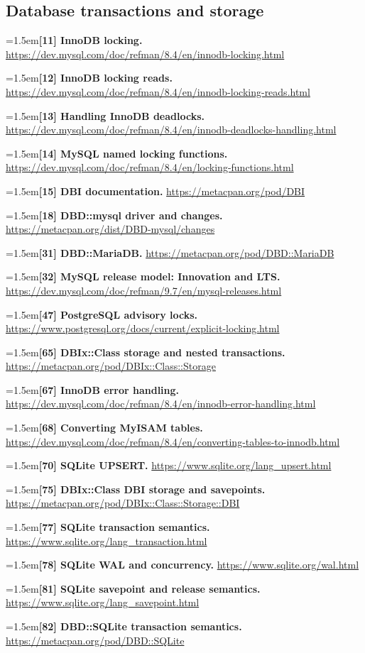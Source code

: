 \documentclass[11pt,openany]{book}
\newcommand{\refdoc}[2]{\par\hangindent=1.5em\hangafter=1\textbf{#1.} \url{#2}\par}
\begin{document}
\subsection{Database transactions and storage}
\refdoc{[11] InnoDB locking}{https://dev.mysql.com/doc/refman/8.4/en/innodb-locking.html}
\refdoc{[12] InnoDB locking reads}{https://dev.mysql.com/doc/refman/8.4/en/innodb-locking-reads.html}
\refdoc{[13] Handling InnoDB deadlocks}{https://dev.mysql.com/doc/refman/8.4/en/innodb-deadlocks-handling.html}
\refdoc{[14] MySQL named locking functions}{https://dev.mysql.com/doc/refman/8.4/en/locking-functions.html}
\refdoc{[15] DBI documentation}{https://metacpan.org/pod/DBI}
\refdoc{[18] DBD::mysql driver and changes}{https://metacpan.org/dist/DBD-mysql/changes}
\refdoc{[31] DBD::MariaDB}{https://metacpan.org/pod/DBD::MariaDB}
\refdoc{[32] MySQL release model: Innovation and LTS}{https://dev.mysql.com/doc/refman/9.7/en/mysql-releases.html}
\refdoc{[47] PostgreSQL advisory locks}{https://www.postgresql.org/docs/current/explicit-locking.html}
\refdoc{[65] DBIx::Class storage and nested transactions}{https://metacpan.org/pod/DBIx::Class::Storage}
\refdoc{[67] InnoDB error handling}{https://dev.mysql.com/doc/refman/8.4/en/innodb-error-handling.html}
\refdoc{[68] Converting MyISAM tables}{https://dev.mysql.com/doc/refman/8.4/en/converting-tables-to-innodb.html}
\refdoc{[70] SQLite UPSERT}{https://www.sqlite.org/lang_upsert.html}
\refdoc{[75] DBIx::Class DBI storage and savepoints}{https://metacpan.org/pod/DBIx::Class::Storage::DBI}
\refdoc{[77] SQLite transaction semantics}{https://www.sqlite.org/lang_transaction.html}
\refdoc{[78] SQLite WAL and concurrency}{https://www.sqlite.org/wal.html}
\refdoc{[81] SQLite savepoint and release semantics}{https://www.sqlite.org/lang_savepoint.html}
\refdoc{[82] DBD::SQLite transaction semantics}{https://metacpan.org/pod/DBD::SQLite}
\end{document}
